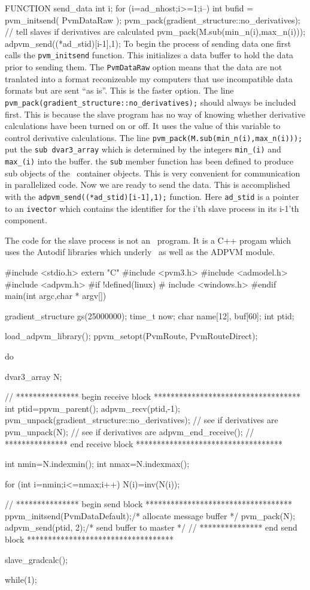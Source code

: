 \beginexample
FUNCTION send_data
  int i;
  for (i=ad_nhost;i>=1;i--) 
  {
    int bufid = pvm_initsend( PvmDataRaw );
    pvm_pack(gradient_structure::no_derivatives); // tell slaves if derivatives are calculated
    pvm_pack(M.sub(min_n(i),max_n(i)));
    adpvm_send((*ad_stid)[i-1],1);
  }
\endexample
To begin the process of sending data one first calls the  {\tt pvm\_initsend}
function. This initializes a data buffer to hold the data prior
to sending them. The {\tt PvmDataRaw} option means that the data are not tranlated
into a format reconizeable my computers that use incompatible data
formats but are sent ``as is''. This is the faster option.
The line {\tt  pvm\_pack(gradient\_structure::no\_derivatives);}
should always be included first. This is because the slave program
has no way of knowing whether derivative calculations have been turned
on or off. It uses the value of this variable to control
derivative calculations.
The line {\tt pvm\_pack(M.sub(min\_n(i),max\_n(i)));} put the {\tt sub dvar3\_array}
which is determined by the integers {\tt min\_(i)} and {\tt max\_(i)} into the buffer.
the {\tt sub} member function has been defined to produce sub objects of the
\ADM\ container objects. This is very convenient for communication in
parallelized code.
Now we are ready to send the data. This is accomplished with the
    {\tt adpvm\_send((*ad\_stid)[i-1],1);} 
  function. Here {\tt ad\_stid} is a
pointer to an {\tt ivector} which contains the identifier for
the i'th slave process in its i-1'th component.

The code for the slave process is not an \ADM\ program. It is a C++ progam which
uses the Autodif libraries which underly \ADM\ as well as the ADPVM module.
\beginexample

#include <stdio.h>
extern "C" {
#include <pvm3.h>
}
#include <admodel.h>
#include <adpvm.h>
#if !defined(linux)
#  include <windows.h>
#endif
main(int argc,char * argv[])
{
  gradient_structure gs(25000000);
  time_t now;
  char name[12], buf[60];
  int ptid;

  load_adpvm_library();
  ppvm_setopt(PvmRoute, PvmRouteDirect);
  
  do
  {
    dvar3_array N;

    // ***************  begin receive block ***********************************
     int ptid=ppvm_parent();
     adpvm_recv(ptid,-1);
     pvm_unpack(gradient_structure::no_derivatives);  // see if derivatives are
     pvm_unpack(N);  // see if derivatives are
     adpvm_end_receive();
    // ***************  end receive block ***********************************
  
     int nmin=N.indexmin();
     int nmax=N.indexmax();

     for (int i=nmin;i<=nmax;i++)
     {
       N(i)=inv(N(i));
     }
  
    // ***************  begin send block ***********************************
    ppvm_initsend(PvmDataDefault);/* allocate message buffer */	
    pvm_pack(N);
    adpvm_send(ptid, 2);/* send buffer to master */
    // ***************  end send block ***********************************

    slave_gradcalc();
  }
  while(1);
}


